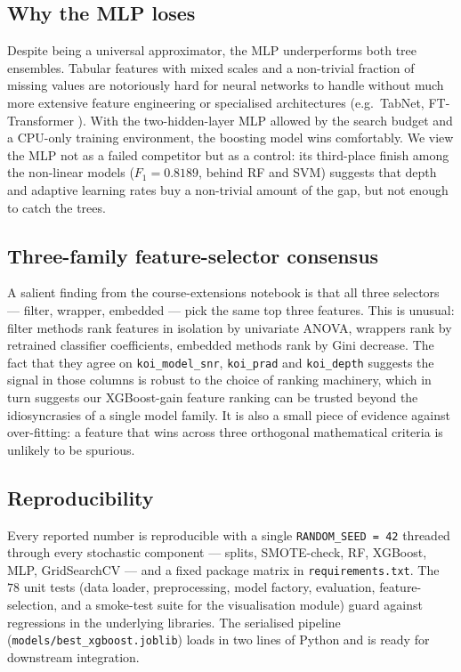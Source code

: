 \documentclass[conference]{IEEEtran}
\begin{document}
\subsection{Why the MLP loses}
Despite being a universal approximator, the MLP underperforms both
tree ensembles. Tabular features with mixed scales and a non-trivial
fraction of missing values are notoriously hard for neural networks
to handle without much more extensive feature engineering or
specialised architectures (e.g.\ TabNet, FT-Transformer
\cite{gorishniy2021revisiting}). With the two-hidden-layer MLP
allowed by the search budget and a CPU-only training environment,
the boosting model wins comfortably. We view the MLP not as a
failed competitor but as a control: its third-place finish among
the non-linear models ($F_1 = 0.8189$, behind RF and SVM) suggests
that depth and adaptive learning rates buy a non-trivial amount of
the gap, but not enough to catch the trees.

\subsection{Three-family feature-selector consensus}
A salient finding from the course-extensions notebook is that all
three selectors --- filter, wrapper, embedded --- pick the same top
three features. This is unusual: filter methods rank features in
isolation by univariate ANOVA, wrappers rank by retrained
classifier coefficients, embedded methods rank by Gini decrease.
The fact that they agree on \texttt{koi\_model\_snr},
\texttt{koi\_prad} and \texttt{koi\_depth} suggests the signal in
those columns is robust to the choice of ranking machinery, which
in turn suggests our XGBoost-gain feature ranking can be trusted
beyond the idiosyncrasies of a single model family. It is also a
small piece of evidence against over-fitting: a feature that wins
across three orthogonal mathematical criteria is unlikely to be
spurious.

\subsection{Reproducibility}
Every reported number is reproducible with a single
\texttt{RANDOM\_SEED = 42} threaded through every stochastic
component --- splits, SMOTE-check, RF, XGBoost, MLP, GridSearchCV
--- and a fixed package matrix in \texttt{requirements.txt}. The
$78$ unit tests (data loader, preprocessing, model factory,
evaluation, feature-selection, and a smoke-test suite for the
visualisation module) guard against regressions in the underlying
libraries. The serialised pipeline
(\texttt{models/best\_xgboost.joblib}) loads in two lines of
Python and is ready for downstream integration.
\end{document}
